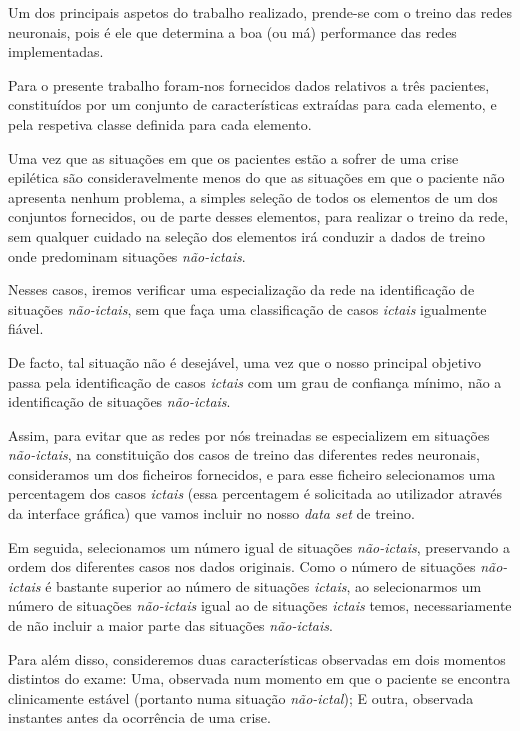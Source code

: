 \documentclass{article}
\begin{document}
Um dos principais aspetos do trabalho realizado, prende-se com o treino das redes neuronais, pois é ele que determina a boa (ou má) performance das redes implementadas.

Para o presente trabalho foram-nos fornecidos dados relativos a três pacientes, constituídos por um conjunto de características extraídas para cada elemento, e pela respetiva classe definida para cada elemento.

Uma vez que as situações em que os pacientes estão a sofrer de uma crise epilética são consideravelmente menos do que as situações em que o paciente não apresenta nenhum problema, a simples seleção de todos os elementos de um dos conjuntos fornecidos, ou de parte desses elementos, para realizar o treino da rede, sem qualquer cuidado na seleção dos elementos irá conduzir a dados de treino onde predominam situações \emph{não-ictais}.

Nesses casos, iremos verificar uma especialização da rede na identificação de situações \emph{não-ictais}, sem que faça uma classificação de casos \emph{ictais} igualmente fiável.

De facto, tal situação não é desejável, uma vez que o nosso principal objetivo passa pela identificação de casos \emph{ictais} com um grau de confiança mínimo, não a identificação de situações \emph{não-ictais}.

Assim, para evitar que as redes por nós treinadas se especializem em situações \emph{não-ictais}, na constituição dos casos de treino das diferentes redes neuronais, consideramos um dos ficheiros fornecidos, e para esse ficheiro selecionamos uma percentagem dos casos \emph{ictais} (essa percentagem é solicitada ao utilizador através da interface gráfica) que vamos incluir no nosso \emph{data set} de treino.

Em seguida, selecionamos um número igual de situações \emph{não-ictais}, preservando a ordem dos diferentes casos nos dados originais. Como o número de situações \emph{não-ictais} é bastante superior ao número de situações \emph{ictais}, ao selecionarmos um número de situações \emph{não-ictais} igual ao de situações \emph{ictais} temos, necessariamente de não incluir a maior parte das situações \emph{não-ictais}.

Para além disso, consideremos duas características observadas em dois momentos distintos do exame: Uma, observada num momento em que o paciente se encontra clinicamente estável (portanto numa situação \emph{não-ictal}); E outra, observada instantes antes da ocorrência de uma crise.
\end{document}
